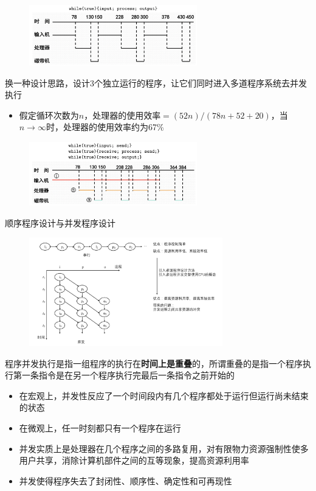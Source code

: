 \documentclass[cs4size,a4paper,10pt]{ctexart}
\begin{document}
	\begin{figure}[H]
		\centering
		\includegraphics[width=0.65\textwidth]{img/6.1.1.2.1}
	\end{figure}

	换一种设计思路，设计3个独立运行的程序，让它们同时进入多道程序系统去并发执行
	\begin{itemize}
		\item 假定循环次数为$n$，处理器的使用效率$=(52n)/(78n+52+20)$，当$n \to \infty$时，处理器的使用效率约为67\%
	\end{itemize}

	\begin{figure}[H]
		\centering
		\includegraphics[width=0.65\textwidth]{img/6.1.1.2.2}
	\end{figure}

	顺序程序设计与并发程序设计
	\begin{figure}[H]
		\centering
		\includegraphics[width=0.75\textwidth]{img/6.1.1.2.3}
	\end{figure}

	程序并发执行是指一组程序的执行在\textbf{时间上是重叠}的，所谓重叠的是指一个程序执行第一条指令是在另一个程序执行完最后一条指令之前开始的
	\begin{itemize}
		\item 在宏观上，并发性反应了一个时间段内有几个程序都处于运行但运行尚未结束的状态
		\item 在微观上，任一时刻都只有一个程序在运行
		\item 并发实质上是处理器在几个程序之间的多路复用，对有限物力资源强制性使多用户共享，消除计算机部件之间的互等现象，提高资源利用率
		\item 并发使得程序失去了封闭性、顺序性、确定性和可再现性
	\end{itemize}
\end{document}
